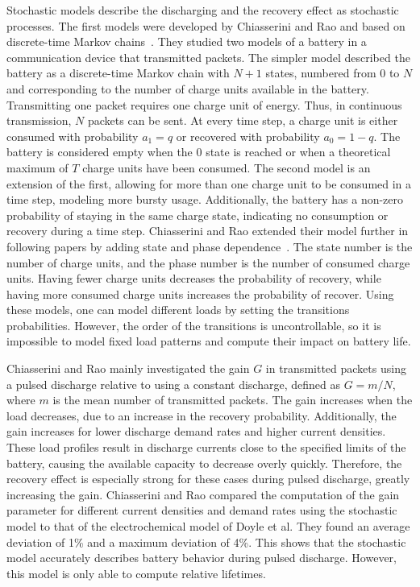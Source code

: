 \documentclass[../zhang_thesis.tex]{subfiles}
\begin{document}
Stochastic models describe the discharging and the recovery effect as stochastic processes. The first models were developed by Chiasserini and Rao and based on discrete-time Markov chains~\cite{chiasserini99b}. They studied two models of a battery in a communication device that transmitted packets. The simpler model described the battery as a discrete-time Markov chain with $N+1$ states, numbered from $0$ to $N$ and corresponding to the number of charge units available in the battery.
Transmitting one packet requires one charge unit of energy. Thus, in continuous transmission, $N$ packets can be sent. At every time step, a charge unit is either consumed with probability $a_1=q$ or recovered with probability $a_0=1-q$. The battery is considered empty when the $0$ state is reached or when a theoretical maximum of $T$ charge units have been consumed. The second model is an extension of the first, allowing for more than one charge unit to be consumed in a time step, modeling
more bursty usage. Additionally, the battery has a non-zero probability of staying in the same charge state, indicating no consumption or recovery during a time step. Chiasserini and Rao extended their model further in following papers by adding state and phase dependence~\cite{chiasserini99,chiasserini01,chiasserini01b}. The state number is the number of charge units, and the phase number is the number of consumed charge units. Having fewer charge units decreases the probability of
recovery, while having more consumed charge units increases the probability of recover. Using these models, one can model different loads by setting the transitions probabilities. However, the order of the transitions is uncontrollable, so it is impossible to model fixed load patterns and compute their impact on battery life.

Chiasserini and Rao mainly investigated the gain $G$ in transmitted packets using a pulsed discharge relative to using a constant discharge, defined as $G=m/N$, where $m$ is the mean number of transmitted packets. The gain increases when the load decreases, due to an increase in the recovery probability. Additionally, the gain increases for lower discharge demand rates and higher current densities. These load profiles result in discharge currents close to the specified limits of the battery, causing the
available capacity to decrease overly quickly. Therefore, the recovery effect is especially strong for these cases during pulsed discharge, greatly increasing the gain. Chiasserini and Rao compared the computation of the gain parameter for different current densities and demand rates using the stochastic model to that of the electrochemical model of Doyle et al. They found an average deviation of 1\% and a maximum deviation of 4\%. This shows that the stochastic model accurately describes battery behavior during pulsed discharge. However, this model is only able to compute relative lifetimes.
\end{document}
